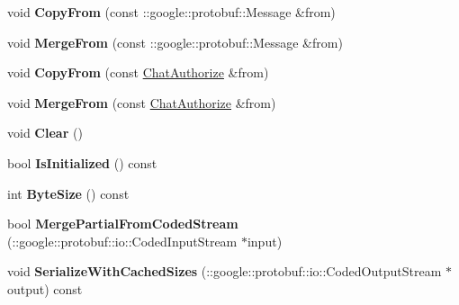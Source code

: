 \begin{DoxyCompactItemize}
\item 
\hypertarget{classSimpleChat_1_1ChatAuthorize_a03ac64a3503ed199f3dda6fd0f037917}{void {\bfseries Copy\-From} (const \-::google\-::protobuf\-::\-Message \&from)}\label{classSimpleChat_1_1ChatAuthorize_a03ac64a3503ed199f3dda6fd0f037917}

\item 
\hypertarget{classSimpleChat_1_1ChatAuthorize_a48fdfb8dc96cd091b9fc233b76d0374d}{void {\bfseries Merge\-From} (const \-::google\-::protobuf\-::\-Message \&from)}\label{classSimpleChat_1_1ChatAuthorize_a48fdfb8dc96cd091b9fc233b76d0374d}

\item 
\hypertarget{classSimpleChat_1_1ChatAuthorize_ab1e8a628454d4fff99e9cb61f528dee8}{void {\bfseries Copy\-From} (const \hyperlink{classSimpleChat_1_1ChatAuthorize}{Chat\-Authorize} \&from)}\label{classSimpleChat_1_1ChatAuthorize_ab1e8a628454d4fff99e9cb61f528dee8}

\item 
\hypertarget{classSimpleChat_1_1ChatAuthorize_ac5af381dc9144fb5d8f24a6e167f692d}{void {\bfseries Merge\-From} (const \hyperlink{classSimpleChat_1_1ChatAuthorize}{Chat\-Authorize} \&from)}\label{classSimpleChat_1_1ChatAuthorize_ac5af381dc9144fb5d8f24a6e167f692d}

\item 
\hypertarget{classSimpleChat_1_1ChatAuthorize_a8b7a933d77521062b037117975c47adc}{void {\bfseries Clear} ()}\label{classSimpleChat_1_1ChatAuthorize_a8b7a933d77521062b037117975c47adc}

\item 
\hypertarget{classSimpleChat_1_1ChatAuthorize_a7b1b8e15a6224defe50585275db9eb16}{bool {\bfseries Is\-Initialized} () const }\label{classSimpleChat_1_1ChatAuthorize_a7b1b8e15a6224defe50585275db9eb16}

\item 
\hypertarget{classSimpleChat_1_1ChatAuthorize_af4891a6c8d555414efce16a1b5899de5}{int {\bfseries Byte\-Size} () const }\label{classSimpleChat_1_1ChatAuthorize_af4891a6c8d555414efce16a1b5899de5}

\item 
\hypertarget{classSimpleChat_1_1ChatAuthorize_a1d571702eb25817fb6f90a888ab8096a}{bool {\bfseries Merge\-Partial\-From\-Coded\-Stream} (\-::google\-::protobuf\-::io\-::\-Coded\-Input\-Stream $\ast$input)}\label{classSimpleChat_1_1ChatAuthorize_a1d571702eb25817fb6f90a888ab8096a}

\item 
\hypertarget{classSimpleChat_1_1ChatAuthorize_a302ac1ec2a227fa677ca01235986f56b}{void {\bfseries Serialize\-With\-Cached\-Sizes} (\-::google\-::protobuf\-::io\-::\-Coded\-Output\-Stream $\ast$output) const }\label{classSimpleChat_1_1ChatAuthorize_a302ac1ec2a227fa677ca01235986f56b}


\end{DoxyCompactItemize}
